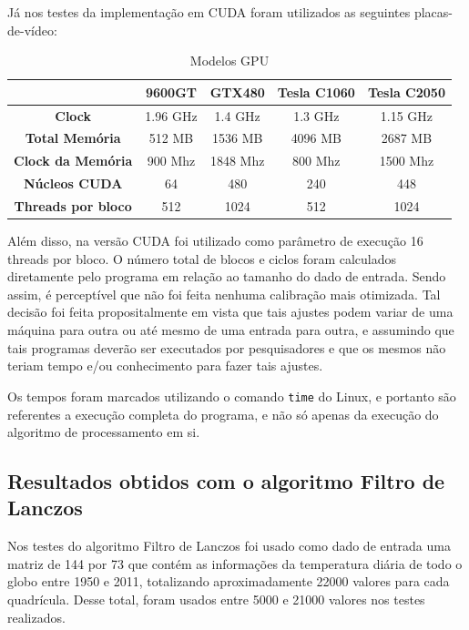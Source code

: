 Já nos testes da implementação em CUDA foram utilizados as seguintes placas-de-vídeo:

\begin{table}[H]
\caption{Modelos GPU}
\begin{center}
\begin{tabular}{ccccc}
 & \textbf{9600GT} & \textbf{GTX480} & \textbf{Tesla C1060} & \textbf{Tesla C2050}\\
\hline\hline
\textbf{Clock}				& 1.96 GHz	& 1.4 GHz 	& 1.3 GHz	& 1.15 GHz \\
\textbf{Total Memória}		& 512 MB		& 1536 MB	& 4096 MB	& 2687 MB \\
\textbf{Clock da Memória}	& 900 Mhz	& 1848 Mhz 	& 800 Mhz	& 1500 Mhz \\
\textbf{Núcleos CUDA}		& 64			& 480		& 240		& 448 \\
\textbf{Threads por bloco}	& 512		& 1024		& 512		& 1024
\end{tabular} 
\end{center}
\end{table}

Além disso, na versão CUDA foi utilizado como parâmetro de execução 16 threads por bloco. O número total de blocos e ciclos foram calculados diretamente pelo programa em relação ao tamanho do dado de entrada. Sendo assim, é perceptível que não foi feita nenhuma calibração mais otimizada. Tal decisão foi feita propositalmente em vista que tais ajustes podem variar de uma máquina para outra ou até mesmo de uma entrada para outra, e assumindo que tais programas deverão ser executados por pesquisadores e que os mesmos não teriam tempo e/ou conhecimento para fazer tais ajustes.

Os tempos foram marcados utilizando o comando \texttt{time} do Linux, e portanto são referentes a execução completa do programa, e não só apenas da execução do algoritmo de processamento em si.

\subsection{Resultados obtidos com o algoritmo Filtro de Lanczos}

Nos testes do algoritmo Filtro de Lanczos foi usado como dado de entrada uma matriz de 144 por 73 que contém as informações da temperatura diária de todo o globo entre 1950 e 2011, totalizando aproximadamente 22000 valores para cada quadrícula. Desse total, foram usados entre 5000 e 21000 valores nos testes realizados.

